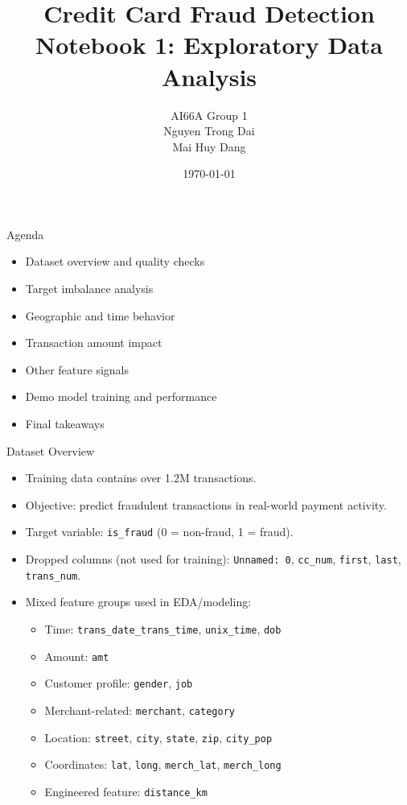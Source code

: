 \documentclass[aspectratio=169]{beamer}
\title{Credit Card Fraud Detection\\Notebook 1: Exploratory Data Analysis}
\author{AI66A Group 1\\Nguyen Trong Dai\\Mai Huy Dang}
\date{\today}
\begin{document}
\begin{frame}
    \titlepage
\end{frame}

\begin{frame}{Agenda}
\begin{itemize}
    \item Dataset overview and quality checks
    \item Target imbalance analysis
    \item Geographic and time behavior
    \item Transaction amount impact
    \item Other feature signals
    \item Demo model training and performance
    \item Final takeaways
\end{itemize}
\end{frame}

\begin{frame}{Dataset Overview}
\begin{itemize}
    \item Training data contains over 1.2M transactions.
    \item Objective: predict fraudulent transactions in real-world payment activity.
    \item Target variable: \texttt{is\_fraud} (0 = non-fraud, 1 = fraud).
    \item Dropped columns (not used for training): \texttt{Unnamed: 0}, \texttt{cc\_num}, \texttt{first}, \texttt{last}, \texttt{trans\_num}.
    \item Mixed feature groups used in EDA/modeling:
    \begin{itemize}
        \item Time: \texttt{trans\_date\_trans\_time}, \texttt{unix\_time}, \texttt{dob}
        \item Amount: \texttt{amt}
        \item Customer profile: \texttt{gender}, \texttt{job}
        \item Merchant-related: \texttt{merchant}, \texttt{category}
        \item Location: \texttt{street}, \texttt{city}, \texttt{state}, \texttt{zip}, \texttt{city\_pop}
        \item Coordinates: \texttt{lat}, \texttt{long}, \texttt{merch\_lat}, \texttt{merch\_long}
        \item Engineered feature: \texttt{distance\_km}
    \end{itemize}
\end{itemize}
\end{frame}
\end{document}

